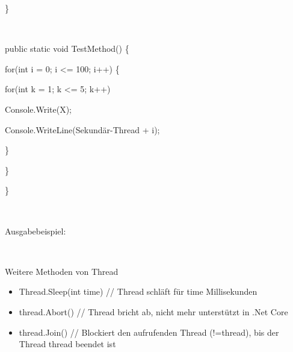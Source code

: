  \}

~

 public static void TestMethod() \{

 for(int i = 0; i {\textless}= 100; i++) \{

 for(int k = 1; k {\textless}= 5; k++)

 Console.Write({\textquotedbl}X{\textquotedbl});

 Console.WriteLine({\textquotedbl}Sekundär-Thread {\textquotedbl} + i);

 \}

 \}

\}

~

Ausgabebeispiel:

~

Weitere Methoden von Thread

\begin{itemize}
\item Thread.Sleep(int time)  // Thread schläft für time Millisekunden
\item thread.Abort() // Thread bricht ab, nicht mehr unterstützt in .Net Core
\item thread.Join() // Blockiert den aufrufenden Thread (!=thread), bis der Thread thread beendet ist 
\end{itemize}
\endinput
